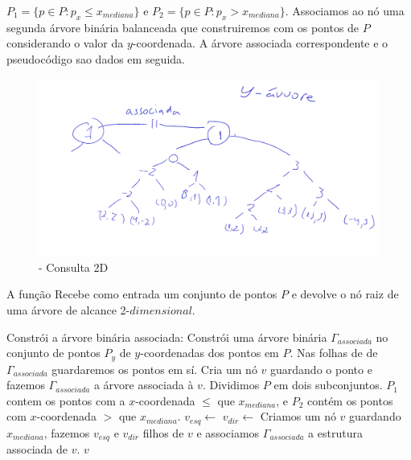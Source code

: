     $P_1 = \{p \in P : p_x \leq x_{mediana}\}$ e $P_2 = \{p \in P : p_x > x_{mediana}\}$.
Associamos ao nó uma segunda árvore binária balanceada que construiremos com os pontos de $P$ 
considerando o valor da $y$-coordenada.
A árvore associada correspondente e o pseudocódigo sao dados em seguida.


\begin{figure}[htb]
    \caption{\label{fig:Fig_16} - Consulta 2D}
    \begin{center}
        \includegraphics[width=\textwidth]{images/assoc_tree.pdf}
    \end{center}
\end{figure}


\begin{algorithm}[H]
    \caption{A função  Recebe como entrada um conjunto de pontos 
    $P$ e devolve o nó raiz de uma árvore de alcance 2-$dimensional$.}
    \begin{algorithmic}[1]
        \State Constrói a árvore binária associada: Constrói uma árvore binária $\Gamma_{associada}$ no conjunto de pontos
        $P_y$  de $y$-coordenadas dos pontos em $P$. Nas folhas de de $\Gamma_{associada}$ guardaremos
        os pontos em sí.
            \State Cria um nó $v$ guardando o ponto e fazemos $\Gamma_{associada}$ a árvore associada 
            à $v$.
        \Else
            \State Dividimos $P$ em dois subconjuntos. $P_1$ contem os pontos com a $x$-coordenada $\leq$
            que $x_{mediana}$, e $P_2$ contém os pontos com $x$-coordenada $>$ que $x_{mediana}$.
            \State $v_{esq} \leftarrow $ 
            \State $v_{dir} \leftarrow $ 
            \State Criamos um nó $v$ guardando $x_{mediana}$, fazemos $v_{esq}$ e $v_{dir}$ filhos de 
            $v$ e associamos $\Gamma_{associada}$ a estrutura associada de $v$.
        \EndIf
    \Return $v$
    \EndFunction
    \end{algorithmic}
\end{algorithm}

